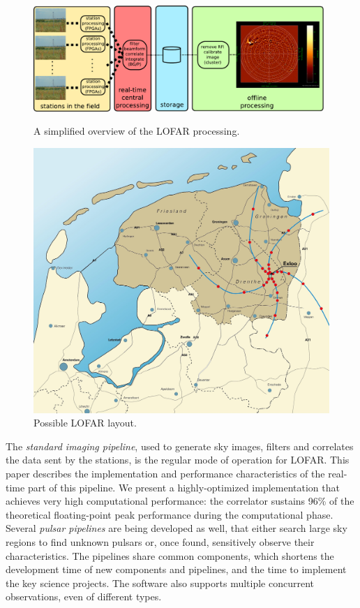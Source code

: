 \documentclass{sig-alternate}
\begin{document}
\begin{figure}
\begin{minipage}[b]{11cm}
\includegraphics[width=11cm]{lofar-overview.pdf}
\caption{A simplified overview of the LOFAR processing.}
\label{fig:lofar-overview}
\end{minipage}
\hfill
\begin{minipage}[b]{6cm}
\includegraphics[width=\columnwidth]{map.jpg}
\caption{Possible LOFAR layout.}
\label{fig:map}
\end{minipage}
\end{figure}

The \emph{standard imaging pipeline}, used to generate sky images,
filters and correlates the data sent by the stations, is the regular mode
of operation for LOFAR. This paper describes the implementation and
performance characteristics of the real-time part of this pipeline.
We present a highly-optimized implementation that achieves very high
computational performance: the correlator sustains 96\% of the theoretical
floating-point peak performance during the computational phase.
Several \emph{pulsar pipelines\/} are being developed as well, that either
search large sky regions to find unknown pulsars or, once found, sensitively
observe their characteristics.
The pipelines share common components, which shortens the development time of
new components and pipelines, and the time to implement the key science projects.
The software also supports multiple concurrent observations, even of different
types.
\end{document}
